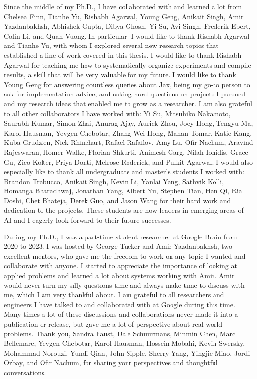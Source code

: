 Since the middle of my Ph.D., I have collaborated with and learned a lot from Chelsea Finn, Tianhe Yu, Rishabh Agarwal, Young Geng, Anikait Singh, Amir Yazdanbakhsh, Abhishek Gupta, Dibya Ghosh, Yi Su, Avi Singh, Frederik Ebert, Colin Li, and Quan Vuong. In particular, I would like to thank Rishabh Agarwal and Tianhe Yu, with whom I explored several new research topics that established a line of work covered in this thesis. I would like to thank Rishabh Agarwal for teaching me how to systematically organize experiments and compile results, a skill that will be very valuable for my future. I would like to thank Young Geng for answering countless queries about Jax, being my go-to person to ask for implementation advice, and asking hard questions on projects I pursued and my research ideas that enabled me to grow as a researcher. I am also grateful to all other collaborators I have worked with: Yi Su, Mitsuhiko Nakamoto, Saurabh Kumar, Simon Zhai, Anurag Ajay, Aurick Zhou, Joey Hong, Tengyu Ma, Karol Hausman, Yevgen Chebotar, Zhang-Wei Hong, Manan Tomar, Katie Kang, Kuba Grudzien, Nick Rhinehart, Rafael Rafailov, Amy Lu, Ofir Nachum, Aravind Rajeswaran, Homer Walke, Florian Shkurti, Animesh Garg, Nilah Ionidis, Grace Gu, Zico Kolter, Priya Donti, Melrose Roderick, and Pulkit Agarwal. I would also especially like to thank all undergraduate and master's students I worked with: Brandon Trabucco, Anikait Singh, Kevin Li, Yanlai Yang, Sathvik Kolli, Homanga Bharadhwaj, Jonathan Yang, Albert Yu, Stephen Tian, Han Qi, Ria Doshi, Chet Bhateja, Derek Guo, and Jason Wang for their hard work and dedication to the projects. These students are now leaders in emerging areas of AI and I eagerly look forward to their future successes.

During my Ph.D., I was a part-time student researcher at Google Brain from 2020 to 2023. I was hosted by George Tucker and Amir Yazdanbakhsh, two excellent mentors, who gave me the freedom to work on any topic I wanted and collaborate with anyone. I started to appreciate the importance of looking at applied problems and learned a lot about systems working with Amir. Amir would never turn my silly questions time and always make time to discuss with me, which I am very thankful about. I am grateful to all researchers and engineers I have talked to and collaborated with at Google during this time. Many times a lot of these discussions and collaborations never made it into a publication or release, but gave me a lot of perspective about real-world problems. Thank you, Sandra Faust, Dale Schuurmans, Minmin Chen, Marc Bellemare, Yevgen Chebotar, Karol Hausman, Hossein Mobahi, Kevin Swersky, Mohammad Norouzi, Yundi Qian, John Sipple, Sherry Yang, Yingjie Miao, Jordi Orbay, and Ofir Nachum, for sharing your perspectives and thoughtful conversations.

